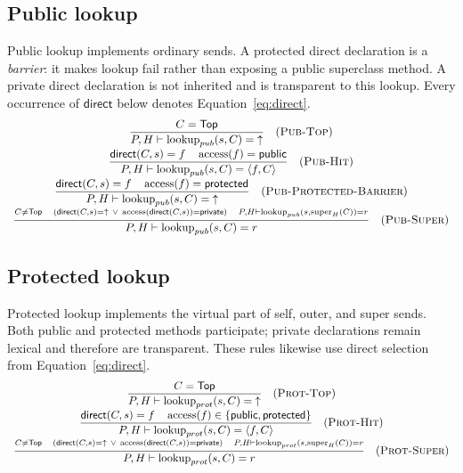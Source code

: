 \documentclass[11pt]{article}
\numberwithin{equation}{section}
\newcommand{\kw}[1]{\ensuremath{\mathsf{#1}}}
\newcommand{\undef}{\mathord{\uparrow}}
\newcommand{\Top}{\kw{Top}}
\newcommand{\Public}{\kw{public}}
\newcommand{\Protected}{\kw{protected}}
\newcommand{\Private}{\kw{private}}
\newcommand{\super}{\mathop{\mathrm{super}}}
\newcommand{\access}{\mathop{\mathrm{access}}}
\newcommand{\lookup}{\mathop{\mathrm{lookup}}}
\newcommand{\rulelabel}[1]{\textsc{#1}}
\begin{document}
\subsection{Public lookup}
\label{sec:public-lookup}

Public lookup implements ordinary sends.  A protected direct declaration is a
\emph{barrier}: it makes lookup fail rather than exposing a public superclass
method.  A private direct declaration is not inherited and is transparent to
this lookup.  Every occurrence of $\mathsf{direct}$ below denotes
Equation~\eqref{eq:direct}.
\[
\begin{array}{c}
\dfrac{C=\Top}{P,H\vdash\lookup_{pub}(s,C)=\undef}
\quad(\rulelabel{Pub-Top})\\[2ex]
\dfrac{\mathsf{direct}(C,s)=f\quad\access(f)=\Public}
      {P,H\vdash\lookup_{pub}(s,C)=\langle f,C\rangle}
\quad(\rulelabel{Pub-Hit})\\[2ex]
\dfrac{\mathsf{direct}(C,s)=f\quad\access(f)=\Protected}
      {P,H\vdash\lookup_{pub}(s,C)=\undef}
\quad(\rulelabel{Pub-Protected-Barrier})\\[2ex]
\dfrac{\substack{C\ne\Top\quad
       (\mathsf{direct}(C,s)=\undef\ \lor\
        \access(\mathsf{direct}(C,s))=\Private)\quad
       P,H\vdash\lookup_{pub}(s,\super_H(C))=r}}
      {P,H\vdash\lookup_{pub}(s,C)=r}
\quad(\rulelabel{Pub-Super})
\end{array}
\]

\subsection{Protected lookup}
\label{sec:protected-lookup}

Protected lookup implements the virtual part of self, outer, and super sends.
Both public and protected methods participate; private declarations remain
lexical and therefore are transparent.  These rules likewise use direct
selection from Equation~\eqref{eq:direct}.
\[
\begin{array}{c}
\dfrac{C=\Top}{P,H\vdash\lookup_{prot}(s,C)=\undef}
\quad(\rulelabel{Prot-Top})\\[2ex]
\dfrac{\mathsf{direct}(C,s)=f\quad
       \access(f)\in\{\Public,\Protected\}}
      {P,H\vdash\lookup_{prot}(s,C)=\langle f,C\rangle}
\quad(\rulelabel{Prot-Hit})\\[2ex]
\dfrac{\substack{C\ne\Top\quad
       (\mathsf{direct}(C,s)=\undef\ \lor\
        \access(\mathsf{direct}(C,s))=\Private)\quad
       P,H\vdash\lookup_{prot}(s,\super_H(C))=r}}
      {P,H\vdash\lookup_{prot}(s,C)=r}
\quad(\rulelabel{Prot-Super})
\end{array}
\]
\end{document}
